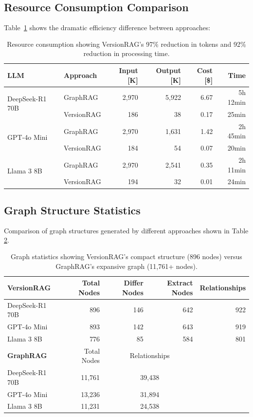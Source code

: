 \newpage

\subsection{Resource Consumption Comparison}

Table~\ref{tab:resource_comparison} shows the dramatic efficiency difference between approaches:

\begin{table}[ht]
\centering
\small
\caption{Resource consumption showing VersionRAG's 97\% reduction in tokens and 92\% reduction in processing time.}
\begin{tabular}{llrrrr}
\hline
LLM & Approach & Input [K] & Output [K] & Cost [\$] & Time \\ \hline
\multirow{2}{*}{DeepSeek-R1 70B} 
& GraphRAG & 2,970 & 5,922 & 6.67 & 5h 12min \\
& VersionRAG & 186 & 38 & 0.17 & 25min \\ \hline
\multirow{2}{*}{GPT-4o Mini} 
& GraphRAG & 2,970 & 1,631 & 1.42 & 2h 45min \\
& VersionRAG & 184 & 54 & 0.07 & 20min \\ \hline
\multirow{2}{*}{Llama 3 8B} 
& GraphRAG & 2,970 & 2,541 & 0.35 & 2h 11min \\
& VersionRAG & 194 & 32 & 0.01 & 24min \\ \hline
\end{tabular}
\label{tab:resource_comparison}
\end{table}

\subsection{Graph Structure Statistics}

Comparison of graph structures generated by different approaches shown in Table \ref{tab:graph_structure_stats}.

\begin{table}[hb]
\centering
\small
\caption{Graph statistics showing VersionRAG's compact structure (896 nodes) versus GraphRAG's expansive graph (11,761+ nodes).}
\begin{tabular}{lrrrr}
\hline
\textbf{VersionRAG} & Total Nodes & Differ Nodes & Extract Nodes & Relationships \\ \hline
DeepSeek-R1 70B & 896 & 146 & 642 & 922 \\
GPT-4o Mini & 893 & 142 & 643 & 919 \\
Llama 3 8B & 776 & 85 & 584 & 801 \\ \hline
\textbf{GraphRAG} & Total Nodes & \multicolumn{2}{c}{Relationships} \\ \hline
DeepSeek-R1 70B & 11,761 & \multicolumn{2}{c}{39,438} \\
GPT-4o Mini & 13,236 & \multicolumn{2}{c}{31,894} \\
Llama 3 8B & 11,231 & \multicolumn{2}{c}{24,538} \\ \hline
\end{tabular}
\label{tab:graph_structure_stats}
\end{table}

